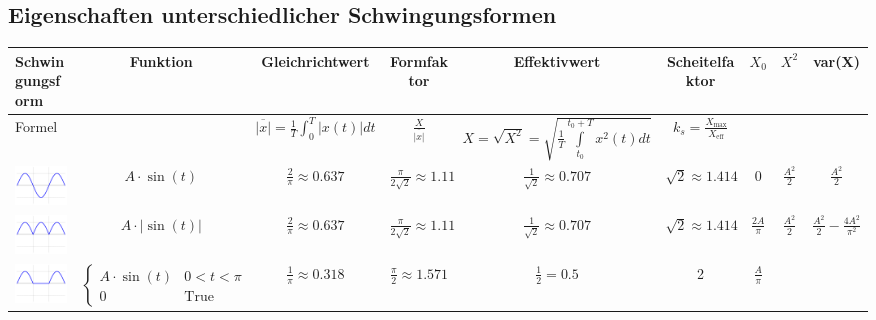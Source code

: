 \begin{table}
	\subsection{Eigenschaften unterschiedlicher Schwingungsformen}
		\begin{tabular}{|l|c|c|c|c|c|c|c|c|}
			\hline
			Schwingungsform & Funktion & Gleichrichtwert & Formfaktor &
			Effektivwert & Scheitelfaktor & $X_0$ & $X^2$ & var(X) \\
			\hline
			Formel &
			&
			$\overline{\left|x\right|} = \frac1T\int_{0}^{T}\left| x(t)\right|dt$&
			$\frac{X}{\overline{\left|x\right|}}$&
			$X = \sqrt{X^2} = \sqrt{\frac{1}{T} \int\limits ^{t_0+T}_{t_0}{x^2(t)dt}}$&
			$k_{s}=\frac{X_{\mathrm{max}}}{X_{\mathrm{eff}}}$&
			&
			&
			\\
			\hline
			\includegraphics[width=2cm]{images/table_sine_wave.png} &
			$A\cdot\sin(t)$ &
			$\frac{2}{\pi} \approx 0.637$ &
			$\frac{\pi}{2\sqrt{2}} \approx 1.11$ &
			$\frac{1}{\sqrt{2}}\approx 0.707$ &
			$\sqrt{2}\approx 1.414$ &
			$0$ &
			$\frac{A^2}{2}$ &
			$\frac{A^2}{2}$ \\
			\hline	
			\includegraphics[width=2cm]{images/table_full-wave_rectified_sine.png} &
			$A\cdot|\sin(t)|$ &
			$\frac{2}{\pi} \approx 0.637$ &
			$\frac{\pi}{2\sqrt{2}} \approx 1.11$ &
			$\frac{1}{\sqrt{2}} \approx 0.707$ &
			$\sqrt{2} \approx 1.414$  &
			$\frac{2A}{\pi}$ & $\frac{A^2}{2}$ & $\frac{A^2}{2}-\frac{4A^2}{\pi^2}$
			\\
			\hline
			\includegraphics[width=2cm]{images/table_half-wave_rectified_sine.png} &
			$\begin{cases} A\cdot\sin (t) & 0<t<\pi  \\ 0 & \text{True}\end{cases}$ &
			$\frac{1}{\pi}\approx 0.318$ &
			$\frac{\pi}{2}\approx 1.571$ &
			$\frac{1}{2} = 0.5$	&
			2  &
			$\frac{A}{\pi}$ &

\end{tabular}
\end{table}
